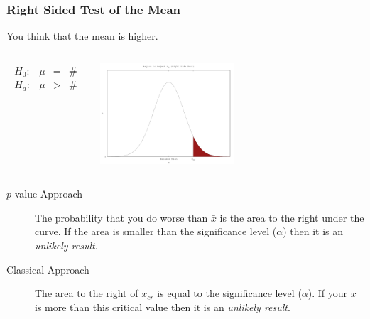 \begin{frame}
  \frametitle{Right Sided Test of the Mean}

  You think that the mean is higher.

  \begin{columns}
    \begin{eqnarray*}
      \begin{array}{lrcl}
        H_0: & \mu & = & \# \\
        H_a: & \mu & > & \#
      \end{array}
    \end{eqnarray*}


    \includegraphics[width=5cm]{img/rightSideHypothesisTest}

  \end{columns}

  \begin{description}
  \item[$p$-value Approach] The probability that you do worse than
    $\bar{x}$ is the area to the right under the curve. If the area is
    smaller than the significance level ($\alpha$) then it is an
    \textit{unlikely result}.
  \item[Classical Approach] The area to the right of $x_{cr}$ is
    equal to the significance level ($\alpha$). If your $\bar{x}$ is
    more than this critical value then it is an \textit{unlikely
      result}.
  \end{description}


\end{frame}


